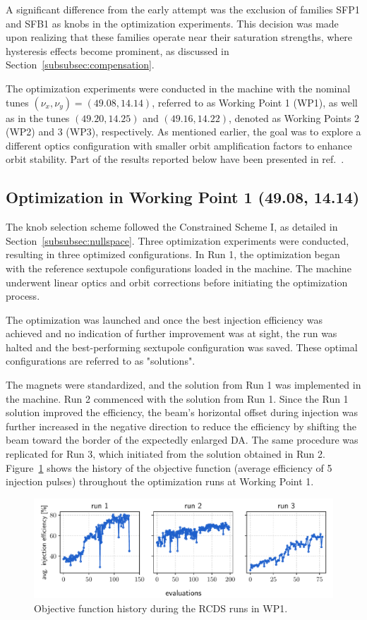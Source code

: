 A significant difference from the early attempt was the exclusion of families SFP1 and SFB1 as knobs in the optimization experiments. This decision was made upon realizing that these families operate near their saturation strengths, where hysteresis effects become prominent, as discussed in Section~\ref{subsubsec:compensation}. 

The optimization experiments were conducted in the machine with the nominal tunes $(\nu_x,\nu_y)=(49.08, 14.14)$, referred to as Working Point 1 (WP1), as well as in the tunes $(49.20, 14.25)$ and $(49.16, 14.22)$, denoted as Working Points 2 (WP2) and 3 (WP3), respectively. As mentioned earlier, the goal was to explore a different optics configuration with smaller orbit amplification factors to enhance orbit stability. Part of the results reported below have been presented in ref.~\cite{velloso_online_2023}.

\subsection{Optimization in Working Point 1 (49.08, 14.14)}
The knob selection scheme followed the Constrained Scheme I, as detailed in Section~\ref{subsubsec:nullspace}. Three optimization experiments were conducted, resulting in three optimized configurations. In Run 1, the optimization began with the reference sextupole configurations loaded in the machine. The machine underwent linear optics and orbit corrections before initiating the optimization process.

The optimization was launched and once the best injection efficiency was achieved and no indication of further improvement was at sight, the run was halted and the best-performing sextupole configuration was saved. These optimal configurations are referred to as "solutions". 

The magnets were standardized, and the solution from Run 1 was implemented in the machine. Run 2 commenced with the solution from Run 1. Since the Run 1 solution improved the efficiency, the beam's horizontal offset during injection was further increased in the negative direction to reduce the efficiency by shifting the beam toward the border of the expectedly enlarged DA. The same procedure was replicated for Run 3, which initiated from the solution obtained in Run 2. Figure~\ref{fig:wp1_history} shows the history of the objective function (average efficiency of 5 injection pulses) throughout the optimization runs at Working Point 1.
\begin{figure}[tb]
    \centering
    \includegraphics[width=\columnwidth]{Images/wp1_objfunc_hist.pdf}
    \caption[Objective function history during the RCDS runs in WP1.]{Objective function history during the RCDS runs in WP1.}
    \label{fig:wp1_history}
\end{figure}
